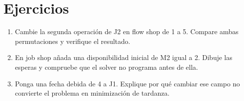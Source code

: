 \section{Ejercicios}
\begin{enumerate}
\item Cambie la segunda operación de J2 en flow shop de 1 a 5.
      Compare ambas permutaciones y verifique el resultado.
\item En job shop añada una disponibilidad inicial de M2 igual a 2.
      Dibuje las esperas y compruebe que el solver no programa antes de ella.
\item Ponga una fecha debida de 4 a J1. Explique por qué cambiar ese campo
      no convierte el problema en minimización de tardanza.
\end{enumerate}

